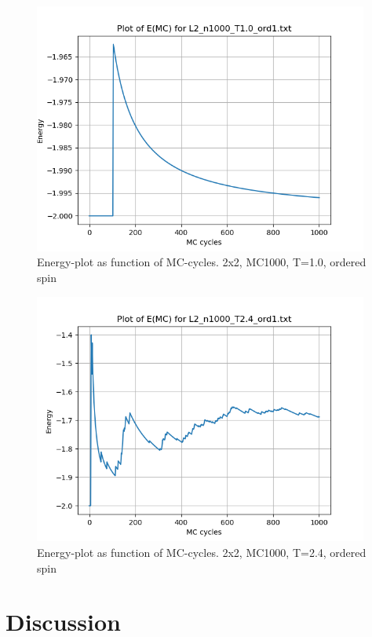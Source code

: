 \documentclass{article}
\begin{document}
\begin{figure}[ht]
    \centering
    \includegraphics[width = 11cm]{img/energy_L2_n1000_T10_ord1.png}
    \caption{Energy-plot as function of MC-cycles. 2x2, MC1000, T=1.0, ordered spin}
    \label{fig:energy_L2_n1000_T1.0_ord1}
  \end{figure}

\begin{figure}[ht]
    \centering
    \includegraphics[width = 11cm]{img/energy_L2_n1000_T24_ord1.png}
    \caption{Energy-plot as function of MC-cycles. 2x2, MC1000, T=2.4, ordered spin}
    \label{fig:energy_L2_n1000_T2.4_ord1}
  \end{figure}


\vspace{1cm}

\clearpage
\newpage

\section{Discussion} \label{sec:Discussion}
\end{document}
